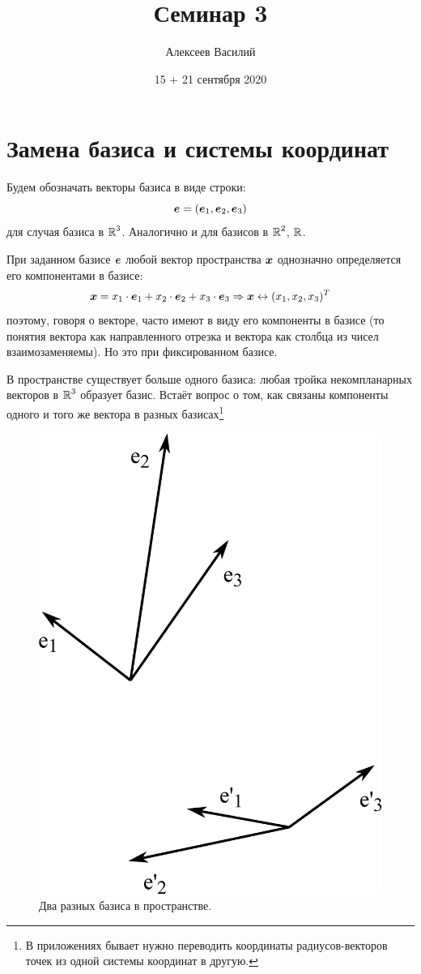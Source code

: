 \documentclass[a4paper,12pt]{article}
\author{Алексеев Василий}
\title{Семинар 3}
\date{15 + 21 сентября 2020}
\begin{document}
  \maketitle
  
  \tableofcontents

  \thispagestyle{empty}
  
  \newpage
  


  \section{Замена базиса и системы координат}
  
  Будем обозначать векторы базиса в виде строки:
  \[
    \bds e \hm= (\bds e_1, \bds e_2, \bds e_3)
  \]
  для случая базиса в $\operatorname{\mathbb R}^3$.
  Аналогично и для базисов в $\operatorname{\mathbb R}^2$, $\operatorname{\mathbb R}$.
  
  При заданном базисе $\boldsymbol e$ любой вектор пространства $\boldsymbol x$ однозначно определяется его компонентами в базисе:
  \[
    \boldsymbol x = x_1 \cdot \boldsymbol e_1 + x_2 \cdot \boldsymbol e_2 + x_3 \cdot \boldsymbol e_3
      \Rightarrow \boldsymbol x \leftrightarrow (x_1, x_2, x_3)^T
  \]
  поэтому, говоря о векторе, часто имеют в виду его компоненты в базисе (то понятия вектора как направленного отрезка и вектора как столбца из чисел взаимозаменяемы).
  Но это при фиксированном базисе.
  
  В пространстве существует больше одного базиса: любая тройка некомпланарных векторов в $\operatorname{\mathbb R}^3$ образует базис.
  Встаёт вопрос о том, как связаны компоненты одного и того же вектора в разных базисах\footnote{В приложениях бывает нужно переводить координаты радиусов-векторов точек из одной системы координат в другую.}
  
  \begin{figure}[h]
    \centering
    
    \includegraphics[width=0.5\columnwidth]{two-basises}
    
    \caption{Два разных базиса в пространстве.}
    \label{fig:two-basises}
  \end{figure}
  
\end{document}
